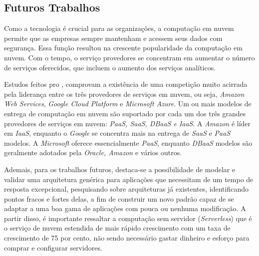 \documentclass[12pt]{article}
\begin{document}
\subsection{Futuros Trabalhos}
Como a tecnologia é crucial para as organizações, a computação em nuvem permite que as empresas sempre mantenham e acessem seus dados com segurança. Essa função resultou na crescente popularidade da computação em nuvem. Com o tempo, o serviço provedores se concentram em aumentar o número de serviços oferecidos, que incluem o aumento dos serviços analíticos. 

Estudos feitos pro \cite{randa}, comprovam a existência de uma competição muito acirrada pela liderança entre os três provedores de serviços em nuvem, ou seja, \emph{Amazon Web Services}, \emph{Google Cloud Platform} e \emph{Microsoft Azure}. Um ou mais modelos de entrega de computação em nuvem são suportado por cada um dos três grandes provedores de serviços em nuvem: \emph{PaaS, SaaS, DBaaS e IaaS}. A \emph{Amazon} é líder em \emph{IaaS}, enquanto o \emph{Google} se concentra mais na entrega de \emph{SaaS} e \emph{PaaS} modelos. A \emph{Microsoft} oferece essencialmente \emph{PaaS}, enquanto \emph{DBaaS} modelos são geralmente adotados pela \emph{Oracle, Amazon} e vários outros.

Ademais, para os trabalhos futuros, destaca-se a possibilidade de modelar e validar uma arquitetura genérica para aplicações que necessitam de um tempo de resposta excepcional, pesquisando sobre arquiteturas já existentes, identificando pontos fracos e fortes delas, a fim de construir um novo padrão capaz de se adaptar a uma boa gama de aplicações com pouca ou nenhuma modificação. A partir disso, é importante ressaltar a computação sem servidor (\emph{Serverless}) que é o serviço de nuvem estendida de mais rápido crescimento com um taxa de crescimento de 75 por cento, não sendo necessário gastar dinheiro e esforço para comprar e configurar servidores. 

\nocite{*}
\medskip



\end{document}
